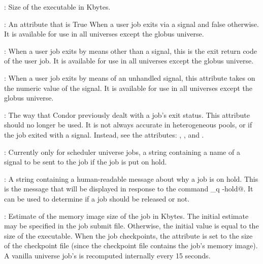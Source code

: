 \begin{description}
\item[\AdAttr{ExecutableSize}] : Size of the executable in Kbytes.

\item[\AdAttr{ExitBySignal}] : An attribute that is True
When a user job exits via a signal and false otherwise.
It is available for use 
in all universes except the globus universe.

\item[\AdAttr{ExitCode}] : When a user job exits by means other than a signal,
this is the exit return code of the user job.
It is available for use 
in all universes except the globus universe.

\item[\AdAttr{ExitSignal}] : When a user job exits by means of an unhandled 
signal, this attribute takes on the numeric value of the signal.
It is available for use 
in all universes except the globus universe.

\item[\AdAttr{ExitStatus}] : The way that Condor previously dealt with
a job's exit status.
This attribute should no longer be used.
It is not always accurate in
heterogeneous pools, or if the job exited with a signal.
Instead, see the attributes: ,
, and
.

\item[\AdAttr{HoldKillSig}] :   Currently only for scheduler universe jobs,
a string containing a name of
a signal to be sent to the job if the job is put on hold.

\item[\AdAttr{HoldReason}] :   A string containing a human-readable
message about why a job is on hold.
This is the message that will be displayed in response to
the command \verb@condor_q -hold@.
It can be used to determine if a job should be released or not.

\item[\AdAttr{ImageSize}] : Estimate of the memory image size of the
job in Kbytes.  The initial estimate may be specified in the job
submit file.  Otherwise, the initial value is equal to the size of the
executable.  When the job checkpoints, the 
attribute is set to the size of the checkpoint file (since the
checkpoint file contains the job's memory image).
A vanilla universe job's  is recomputed
internally every 15 seconds.


\end{description}
